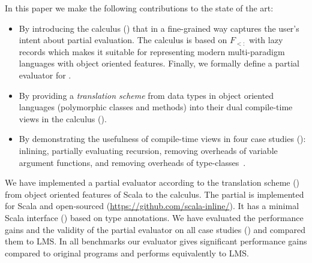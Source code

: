 In this paper we make the following contributions to the state of the art:
\begin{itemize}

 \item By introducing the \calculus calculus () that in a
  fine-grained way captures the user's intent about partial evaluation. The calculus
  is based on $F_{<:}$ with lazy records which makes it suitable for representing
  modern multi-paradigm languages with object oriented features. Finally,
  we formally define a partial evaluator for \calculus.

 \item By providing a \emph{translation scheme} from data types in object oriented languages
  (polymorphic classes and methods) into their dual compile-time views in the
  \calculus calculus ().

 \item By demonstrating the usefulness of compile-time views in four case
 studies (): inlining, partially evaluating recursion,
 removing overheads of variable argument functions, and removing overheads of
 type-classes~\cite{oliveira2010type}.

\end{itemize}

We have implemented a partial evaluator according to the translation scheme ()
 from object oriented features of Scala to the \calculus calculus. The partial is
 implemented for Scala and open-sourced (\url{https://github.com/scala-inline/}).
 It has a minimal Scala interface () based on type annotations.
 We have evaluated the performance gains and the validity of the partial evaluator
 on all case studies () and compared them to LMS. In all benchmarks
 our evaluator gives significant performance gains compared to original programs and
 performs equivalently to LMS.






